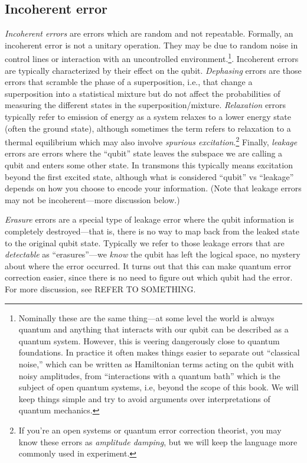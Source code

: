 \subsection{Incoherent error}
\textit{Incoherent errors} are errors which are random and not repeatable. Formally, an incoherent error is not a unitary operation. They may be due to random noise in control lines or interaction with an uncontrolled environment.\footnote{Nominally these are the same thing---at some level the world is always quantum and anything that interacts with our qubit can be described as a quantum system. However, this is veering dangerously close to quantum foundations. In practice it often makes things easier to separate out ``classical noise,'' which can be written as Hamiltonian terms acting on the qubit with noisy amplitudes, from ``interactions with a quantum bath'' which is the subject of open quantum systems, i.e, beyond the scope of this book. We will keep things simple and try to avoid arguments over interpretations of quantum mechanics.}. Incoherent errors are typically characterized by their effect on the qubit. \textit{Dephasing} errors are those errors that scramble the phase of a superposition, i.e., that change a superposition into a statistical mixture but do not affect the probabilities of measuring the different states in the superposition/mixture. \textit{Relaxation} errors typically refer to emission of energy as a system relaxes to a lower energy state (often the ground state), although sometimes the term refers to relaxation to a thermal equilibrium which may also involve \textit{spurious excitation}.\footnote{If you're an open systems or quantum error correction theorist, you may know these errors as \textit{amplitude damping}, but we will keep the language more commonly used in experiment.} Finally, \textit{leakage} errors are errors where the ``qubit'' state leaves the subspace we are calling a qubit and enters some other state. In transmons this typically means excitation beyond the first excited state, although what is considered ``qubit'' vs ``leakage'' depends on how you choose to encode your information. (Note that leakage errors may not be incoherent---more discussion below.)

\textit{Erasure} errors are a special type of leakage error where the qubit information is completely destroyed---that is, there is no way to map back from the leaked state to the original qubit state. Typically we refer to those leakage errors that are \textit{detectable} as ``erasures''---we \textit{know} the qubit has left the logical space, no mystery about where the error occurred. It turns out that this can make quantum error correction easier, since there is no need to figure out which qubit had the error. For more discussion, see REFER TO SOMETHING.

